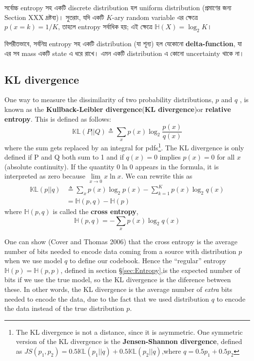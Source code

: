 \documentclass[graybox, envcountchap, twocolumn]{styles/svmult}
\begin{document}
{{\bengalifont সর্বোচ্চ entropy সহ একটি discrete distribution হল uniform distribution (প্রমাণের জন্য Section XXX দ্রষ্টব্য)। সুতরাং, যদি একটি $K$-ary random variable এর ক্ষেত্রে $p(x=k) = 1/K$, তাহলে entropy সর্বাধিক হয়; এই ক্ষেত্রে $\mathbb{H}(X) = \log_2 K$।}

{\bengalifont বিপরীতভাবে, সর্বনিম্ন entropy সহ একটি distribution (যা শূন্য) হল যেকোনো \textbf{delta-function}, যা এর সব mass একটি state এ ধরে রাখে। এমন একটি distribution এ কোনো uncertainty থাকে না।}


\subsection{KL divergence}
One way to measure the dissimilarity of two probability distributions, $p$ and $q$ , is known as the \textbf{Kullback-Leibler divergence}(\textbf{KL divergence})or \textbf{relative entropy}. This is defined as follows:
\begin{equation}
\mathbb{KL}(P||Q) \triangleq 
\sum\limits_{x}{p(x)\log_2\dfrac{p(x)}{q(x)}}
\end{equation}
where the sum gets replaced by an integral for pdfs\footnote{The KL divergence is not a distance, since it is asymmetric. One symmetric version of the KL divergence is the \textbf{Jensen-Shannon divergence}, defined as $JS(p_1,p_2)=0.5\mathbb{KL}(p_1||q)+0.5\mathbb{KL}(p_2||q)$,where $q=0.5p_1+0.5p_2$}. The KL divergence is only defined if P and Q both sum to 1 and if $q(x)=0$ implies $p(x)=0$ for all $x$(absolute continuity). If the quantity  $0\ln0$ appears in the formula, it is interpreted as zero because $\lim\limits_{x \to 0}x\ln x$. We can rewrite this as
\begin{equation}\begin{split}
\mathbb{KL}(p||q) & \triangleq \sum\limits_{x}{p(x)\log_2p(x)}-\sum\limits_{k=1}^{K}{p(x)\log_2q(x)} \\
    & =\mathbb{H}(p,q)-\mathbb{H}(p)
\end{split}\end{equation}
where $\mathbb{H}(p,q)$ is called the \textbf{cross entropy},
\begin{equation}\label{eqn:cross-entropy}
\mathbb{H}(p,q)=-\sum\limits_{x}{p(x)\log_2q(x)}
\end{equation}

One can show (Cover and Thomas 2006) that the cross entropy is the average number of bits needed to encode data coming from a source with distribution $p$ when we use model $q$ to define our codebook. Hence the “regular” entropy $\mathbb{H}(p)=\mathbb{H}(p,p)$, defined in section \S \ref{sec:Entropy},is the expected number of bits if we use the true model, so the KL divergence is the diference between these. In other words, the KL divergence is the average number of \emph{extra} bits needed to encode the data, due to the fact that we used distribution $q$ to encode the data instead of the true distribution $p$.

}
\end{document}
